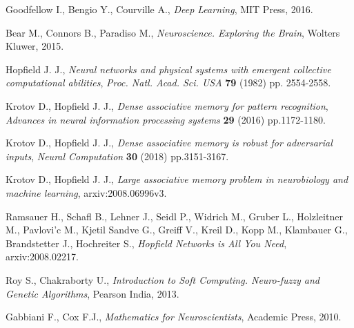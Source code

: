 \documentclass[letterpaper,12pt]{article}
\begin{document}
\begin{thebibliography}{99}

Goodfellow I., Bengio Y., Courville A., \emph{Deep Learning}, MIT Press, 2016.

Bear M., Connors B., Paradiso M., \emph{Neuroscience. Exploring the Brain}, Wolters Kluwer, 2015.

Hopfield J. J., \emph{Neural networks and physical systems with emergent collective computational abilities}, \emph{Proc. Natl. Acad. Sci. USA} {\bf 79} (1982) pp. 2554-2558.

Krotov D., Hopfield J. J., \emph{Dense associative memory for pattern recognition}, \emph{Advances in neural information processing systems} {\bf 29} (2016) pp.1172-1180.

Krotov D., Hopfield J. J., \emph{Dense associative memory is robust for adversarial inputs}, \emph{Neural Computation} {\bf 30} (2018) pp.3151-3167.

Krotov D., Hopfield J. J., \emph{Large associative memory problem in neurobiology and machine learning}, arxiv:2008.06996v3.

Ramsauer H., Schafl B., Lehner J., Seidl P., Widrich M., Gruber L., Holzleitner M., Pavlovi'c M., Kjetil Sandve G., Greiff V., Kreil D., Kopp M., Klambauer G., Brandstetter J., Hochreiter S., \emph{Hopfield Networks is All You Need}, arxiv:2008.02217.

Roy S., Chakraborty U., \emph{Introduction to Soft Computing. Neuro-fuzzy and Genetic Algorithms}, Pearson India, 2013.

Gabbiani F., Cox F.J., \emph{Mathematics for Neuroscientists}, Academic Press, 2010.

\end{thebibliography}
\end{document}
